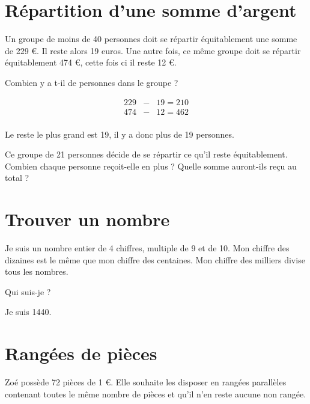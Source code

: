 \documentclass[a4paper,11pt]{exam}
\begin{document}
\section{Répartition d'une somme d'argent}
	Un groupe de moins de 40 personnes doit se répartir équitablement une somme de 229 €. Il reste alors 19 euros. Une autre fois, ce même groupe doit se répartir équitablement 474  €, cette fois ci il reste 12 €.
	\begin{questions} %
		
		\question Combien y a t-il de personnes dans le groupe ?
		\begin{solution}
			\begin{eqnarray*}
				\num{229} & - & \num{19} = \num{210} \\
				\num{474} & - & \num{12} = \num{462} \\
			\end{eqnarray*}
			
			Le reste le plus grand est 19, il y a donc plus de 19 personnes.
			
		\end{solution}
		
		\question Ce groupe de 21 personnes décide de se répartir ce qu'il reste équitablement. Combien chaque personne reçoit-elle en plus ? Quelle somme auront-ils reçu au total ?
	\end{questions}
	
\section{Trouver un nombre}
	
	Je suis un nombre entier de 4 chiffres, multiple de 9 et de 10.
	Mon chiffre des dizaines est le même que mon chiffre des centaines.
	Mon chiffre des milliers divise tous les nombres.
	
	
	\begin{questions}
		\question Qui suis-je ?
		\begin{solution}
			Je suis \num{1440}.
		\end{solution}
	\end{questions}
	
	
\section{Rangées de pièces}
	Zoé possède 72 pièces de 1 €. Elle souhaite les disposer en rangées parallèles contenant toutes le même nombre de pièces et qu'il n'en reste aucune non rangée.
	
\end{document}
